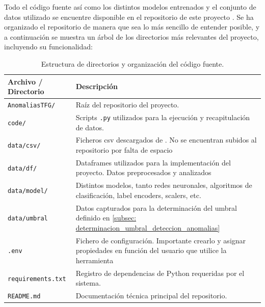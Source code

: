 \documentclass[12pt]{article}
\numberwithin{equation}{section} %
\begin{document}
    \vspace{5mm}

    Todo el código fuente así como los distintos modelos entrenados y el conjunto de datos utilizado se encuentre disponible en el repositorio de este proyecto \cite{github_tfg}. Se ha organizado el repositorio de manera que sea lo más sencillo de entender posible, y a continuación se muestra un árbol de los directorios más relevantes del proyecto, incluyendo su funcionalidad:

    \vspace{5mm}

    \begin{table}[H]
    \centering
    \small
    \renewcommand{\arraystretch}{1.5} %
    \begin{tabular}{|>{\centering\arraybackslash}m{4cm}|>{\centering\arraybackslash}m{10cm}|}
    \hline            
    \textbf{Archivo / Directorio} & \textbf{Descripción} \\ \hline
    \texttt{AnomaliasTFG/} & Raíz del repositorio del proyecto. \\ \hline
    \texttt{code/} & Scripts \texttt{.py} utilizados para la ejecución y recapitulación de datos. \\ \hline
    \texttt{data/csv/} & Ficheros csv descargados de \cite{CICIDS2017}. No se encuentran subidos al repositorio por falta de espacio \\ \hline
    \texttt{data/df/} & Dataframes utilizados para la implementación del proyecto. Datos preprocesados y analizados \\ \hline
    \texttt{data/model/} & Distintos modelos, tanto redes neuronales, algoritmos de clasificación, label encoders, scalers, etc. \\ \hline
    \texttt{data/umbral} & Datos capturados para la determinación del umbral definido en \ref{subsec: determinacion_umbral_deteccion_anomalias} \\ \hline
    \texttt{.env} & Fichero de configuración. Importante crearlo y asignar propiedades en función del usuario que utilice la herramienta \\ \hline
    \texttt{requirements.txt} & Registro de dependencias de Python requeridas por el sistema. \\ \hline
    \texttt{README.md} & Documentación técnica principal del repositorio. \\ \hline
    \end{tabular}
    \caption{Estructura de directorios y organización del código fuente.}
    \label{tab:estructura_archivos}
    \end{table}

    \vspace{10mm}





    \newpage
    \thispagestyle{empty}
    \mbox{}

    \newpage
    \thispagestyle{empty}
    \mbox{}
    
    \nocite{*} %
    
\end{document}
